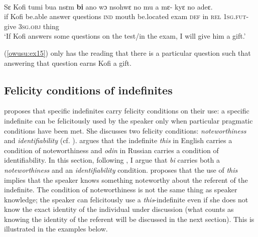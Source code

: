 \documentclass[output=paper,modfonts,nonflat,draftmode]{langsci/langscibook}
\begin{document}
\ea\label{owusu:ex15} \\
\gll  Sε Kofi tumi bua nsεm \textbf{bi} ano wɔ nsohwε no mu a mε- kyε no adeε.\\
 if Kofi be.able answer questions \textsc{ind} mouth be.located exam \textsc{def} in \textsc{rel} \textsc{1sg.fut}- give \textsc{3sg}.\textsc{obj} thing \\
\glt `If Kofi answers some questions on the test/in the exam, I will give him a gift.'
\z 

(\ref{owusu:ex15}) only has the reading that there is a particular question such that answering that question earns Kofi a gift. 

\subsection{Felicity conditions of indefinites}

\citet{Ionin2006} proposes that specific indefinites carry felicity conditions on their use: a specific indefinite can be felicitously used by the speaker only when particular pragmatic conditions have been met. She discusses two felicity conditions: \emph{noteworthiness} and \emph{identifiability} (cf. \citealt{AbuschRooth1997,Farkas2002b}). \citet{Ionin2013} argues that the indefinite \emph{this} in English carries a condition of noteworthiness and \emph{odin} in Russian carries a condition of identifiability. In this section, following \citet{Ionin2013}, I  argue that \emph{bi} carries both a \emph{noteworthiness} and an \emph{identifiability} condition. \citet{Ionin2006} proposes that the use of \emph{this} implies that the speaker knows something noteworthy about the referent of the indefinite. The condition of noteworthiness is not the same thing as speaker knowledge; the speaker can felicitously use a \emph{this}-indefinite even if she does not know the exact identity of the individual under discussion (what counts as knowing the identity of the referent will be discussed in the next section). This is illustrated in the examples below. 
\ea {}\\

 \label{owusu:ex18}

\label{owusu:ex19}
 \label{owusu:ex200}
\end{document}

